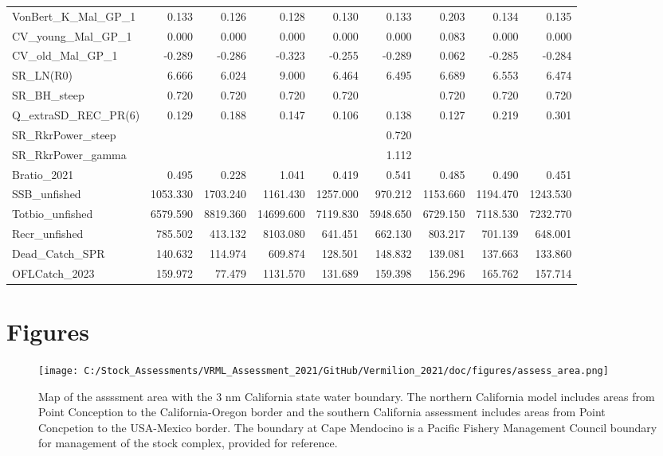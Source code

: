 \documentclass[
  english,
  a4paper,
]{article}
\begin{document}
\begin{table}
{\begin{tabular}[t]{lrrrrrrrr}
VonBert\_K\_Mal\_GP\_1 & 0.133 & 0.126 & 0.128 & 0.130 & 0.133 & 0.203 & 0.134 & 0.135\\
CV\_young\_Mal\_GP\_1 & 0.000 & 0.000 & 0.000 & 0.000 & 0.000 & 0.083 & 0.000 & 0.000\\
CV\_old\_Mal\_GP\_1 & -0.289 & -0.286 & -0.323 & -0.255 & -0.289 & 0.062 & -0.285 & -0.284\\
SR\_LN(R0) & 6.666 & 6.024 & 9.000 & 6.464 & 6.495 & 6.689 & 6.553 & 6.474\\
SR\_BH\_steep & 0.720 & 0.720 & 0.720 & 0.720 &  & 0.720 & 0.720 & 0.720\\
Q\_extraSD\_REC\_PR(6) & 0.129 & 0.188 & 0.147 & 0.106 & 0.138 & 0.127 & 0.219 & 0.301\\
SR\_RkrPower\_steep &  &  &  &  & 0.720 &  &  & \\
SR\_RkrPower\_gamma &  &  &  &  & 1.112 &  &  & \\
Bratio\_2021 & 0.495 & 0.228 & 1.041 & 0.419 & 0.541 & 0.485 & 0.490 & 0.451\\
SSB\_unfished & 1053.330 & 1703.240 & 1161.430 & 1257.000 & 970.212 & 1153.660 & 1194.470 & 1243.530\\
Totbio\_unfished & 6579.590 & 8819.360 & 14699.600 & 7119.830 & 5948.650 & 6729.150 & 7118.530 & 7232.770\\
Recr\_unfished & 785.502 & 413.132 & 8103.080 & 641.451 & 662.130 & 803.217 & 701.139 & 648.001\\
Dead\_Catch\_SPR & 140.632 & 114.974 & 609.874 & 128.501 & 148.832 & 139.081 & 137.663 & 133.860\\
OFLCatch\_2023 & 159.972 & 77.479 & 1131.570 & 131.689 & 159.398 & 156.296 & 165.762 & 157.714\\
\bottomrule
\end{tabular}}
\end{table}

\clearpage

\hypertarget{figures}{%
\section{Figures}\label{figures}}

\FloatBarrier

\begin{figure}
\centering
\texttt{[image: C:/Stock\_Assessments/VRML\_Assessment\_2021/GitHub/Vermilion\_2021/doc/figures/assess\_area.png]}
\caption{Map of the assssment area with the 3 nm California state water boundary. The northern California model includes areas from Point Conception to the California-Oregon border and the southern California assessment includes areas from Point Concpetion to the USA-Mexico border. The boundary at Cape Mendocino is a Pacific Fishery Management Council boundary for management of the stock complex, provided for reference.\label{fig:assess-area}}
\end{figure}
\end{document}
